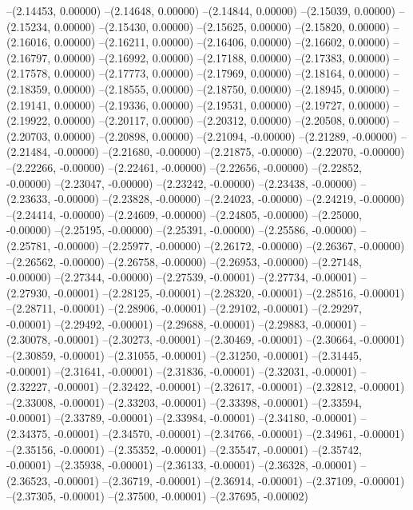 --(2.14453, 0.00000)
--(2.14648, 0.00000)
--(2.14844, 0.00000)
--(2.15039, 0.00000)
--(2.15234, 0.00000)
--(2.15430, 0.00000)
--(2.15625, 0.00000)
--(2.15820, 0.00000)
--(2.16016, 0.00000)
--(2.16211, 0.00000)
--(2.16406, 0.00000)
--(2.16602, 0.00000)
--(2.16797, 0.00000)
--(2.16992, 0.00000)
--(2.17188, 0.00000)
--(2.17383, 0.00000)
--(2.17578, 0.00000)
--(2.17773, 0.00000)
--(2.17969, 0.00000)
--(2.18164, 0.00000)
--(2.18359, 0.00000)
--(2.18555, 0.00000)
--(2.18750, 0.00000)
--(2.18945, 0.00000)
--(2.19141, 0.00000)
--(2.19336, 0.00000)
--(2.19531, 0.00000)
--(2.19727, 0.00000)
--(2.19922, 0.00000)
--(2.20117, 0.00000)
--(2.20312, 0.00000)
--(2.20508, 0.00000)
--(2.20703, 0.00000)
--(2.20898, 0.00000)
--(2.21094, -0.00000)
--(2.21289, -0.00000)
--(2.21484, -0.00000)
--(2.21680, -0.00000)
--(2.21875, -0.00000)
--(2.22070, -0.00000)
--(2.22266, -0.00000)
--(2.22461, -0.00000)
--(2.22656, -0.00000)
--(2.22852, -0.00000)
--(2.23047, -0.00000)
--(2.23242, -0.00000)
--(2.23438, -0.00000)
--(2.23633, -0.00000)
--(2.23828, -0.00000)
--(2.24023, -0.00000)
--(2.24219, -0.00000)
--(2.24414, -0.00000)
--(2.24609, -0.00000)
--(2.24805, -0.00000)
--(2.25000, -0.00000)
--(2.25195, -0.00000)
--(2.25391, -0.00000)
--(2.25586, -0.00000)
--(2.25781, -0.00000)
--(2.25977, -0.00000)
--(2.26172, -0.00000)
--(2.26367, -0.00000)
--(2.26562, -0.00000)
--(2.26758, -0.00000)
--(2.26953, -0.00000)
--(2.27148, -0.00000)
--(2.27344, -0.00000)
--(2.27539, -0.00001)
--(2.27734, -0.00001)
--(2.27930, -0.00001)
--(2.28125, -0.00001)
--(2.28320, -0.00001)
--(2.28516, -0.00001)
--(2.28711, -0.00001)
--(2.28906, -0.00001)
--(2.29102, -0.00001)
--(2.29297, -0.00001)
--(2.29492, -0.00001)
--(2.29688, -0.00001)
--(2.29883, -0.00001)
--(2.30078, -0.00001)
--(2.30273, -0.00001)
--(2.30469, -0.00001)
--(2.30664, -0.00001)
--(2.30859, -0.00001)
--(2.31055, -0.00001)
--(2.31250, -0.00001)
--(2.31445, -0.00001)
--(2.31641, -0.00001)
--(2.31836, -0.00001)
--(2.32031, -0.00001)
--(2.32227, -0.00001)
--(2.32422, -0.00001)
--(2.32617, -0.00001)
--(2.32812, -0.00001)
--(2.33008, -0.00001)
--(2.33203, -0.00001)
--(2.33398, -0.00001)
--(2.33594, -0.00001)
--(2.33789, -0.00001)
--(2.33984, -0.00001)
--(2.34180, -0.00001)
--(2.34375, -0.00001)
--(2.34570, -0.00001)
--(2.34766, -0.00001)
--(2.34961, -0.00001)
--(2.35156, -0.00001)
--(2.35352, -0.00001)
--(2.35547, -0.00001)
--(2.35742, -0.00001)
--(2.35938, -0.00001)
--(2.36133, -0.00001)
--(2.36328, -0.00001)
--(2.36523, -0.00001)
--(2.36719, -0.00001)
--(2.36914, -0.00001)
--(2.37109, -0.00001)
--(2.37305, -0.00001)
--(2.37500, -0.00001)
--(2.37695, -0.00002)
